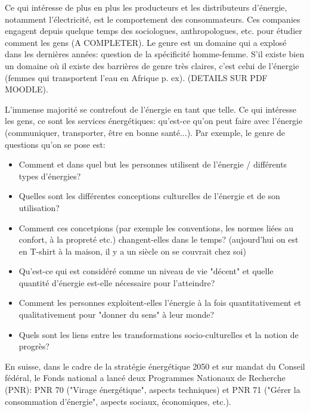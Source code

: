 \documentclass{article}
\begin{document}
 Ce qui intéresse de plus en plus les producteurs et les distributeurs d'énergie, notamment l'électricité, est le comportement des consommateurs. Ces companies engagent depuis quelque temps des sociologues, anthropologues, etc. pour étudier comment les gens (A COMPLETER). Le genre est un domaine qui a explosé dans les dernières années: question de la spécificité homme-femme. S'il existe bien un domaine où il existe des barrières de genre très claires, c'est celui de l'énergie (femmes qui transportent l'eau en Afrique p. ex). (DETAILS SUR PDF MOODLE).\par
 L'immense majorité se contrefout de l'énergie en tant que telle. Ce qui intéresse les gens, ce sont les services énergétiques: qu'est-ce qu'on peut faire avec l'énergie (communiquer, transporter, être en bonne santé...). Par exemple, le genre de questions qu'on se pose est:
 \begin{itemize}
 	\item Comment et dans quel but les personnes utilisent de l'énergie / différents types d'énergies?
 	\item Quelles sont les différentes conceptions culturelles de l'énergie et de son utilisation?
 	\item Comment ces concetpions (par exemple les conventions, les normes liées au confort, à la propreté etc.) changent-elles dans le temps? (aujourd'hui on est en T-shirt à la maison, il y a un siècle on se couvrait chez soi)
 	\item Qu'est-ce qui est considéré comme un niveau de vie "décent" et quelle quantité d'énergie est-elle nécessaire pour l'atteindre?
 	\item Comment les personnes exploitent-elles l'énergie à la fois quantitativement et qualitativement pour "donner du sens" à leur monde?
 	\item Quels sont les liens entre les transformations socio-culturelles et la notion de progrès?
 \end{itemize}
En suisse, dans le cadre de la stratégie énergétique 2050 et sur mandat du Conseil fédéral, le Fonds national a lancé deux Programmes Nationaux de Recherche (PNR): PNR 70 ("Virage énergétique", aspects techniques) et PNR 71 ("Gérer la consommation d'énergie", aspects sociaux, économiques, etc.).
\end{document}

